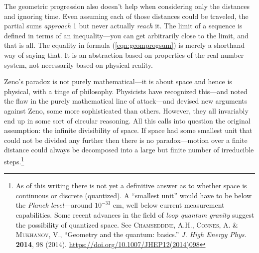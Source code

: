 The geometric progression also doesn't help when considering only the
distances and ignoring time. Even assuming each of those distances could be
traveled, the partial sums
\emph{approach} 1 but never actually \emph{reach} it. The limit of a
sequence is defined in terms of an inequality---you can get arbitrarily
close to the limit, and that is all. The equality in formula
(\ref{eqn:geomprogsum}) is merely a shorthand way of saying that. It is an
abstraction based on properties of the real number system, not necessarily
based on physical reality.

Zeno's paradox is not purely mathematical---it is about space and hence is
physical, with a tinge of philosophy. Physicists have recognized this---and
noted the flaw in the purely mathematical line of attack---and devised new
arguments against Zeno, some more sophisticated than others. However, they
all invariably end up in some sort of circular reasoning.
All this calls into question the original assumption: the infinite divisibility
of space. If space had some smallest unit that could not be divided any further
then there is no paradox---motion over a finite distance could always be
decomposed into a large but finite number of irreducible steps.\footnote{As of
this writing there is not yet a
definitive answer as to whether space is continuous or discrete (quantized).
A ``smallest unit'' would have to be below the \emph{Planck level}---around
$10^{-33}$ cm, well below current measurement capabilities. Some recent advances
in the field of \emph{loop quantum gravity} suggest the possibility of quantized
space. See \textsc{Chamseddine, A.H., Connes, A. \& Mukhanov, V.}, ``Geometry and
the quantum: basics.'' \emph{J. High Energy Phys.} \textbf{2014}, 98 (2014).
 \url{https://doi.org/10.1007/JHEP12(2014)098}}\vspace{1mm}

